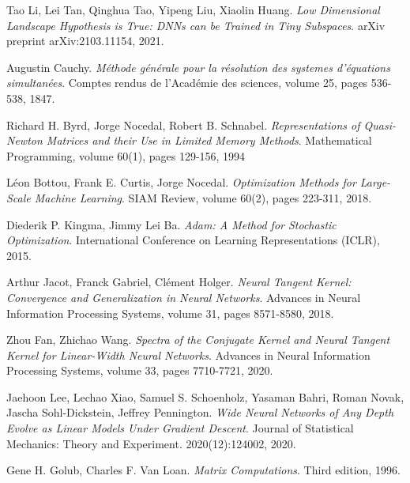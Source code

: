 \documentclass[11pt, a4paper]{article}
\begin{document}
\pagebreak
\begin{thebibliography}{999}

 Tao Li, Lei Tan, Qinghua Tao, Yipeng Liu, Xiaolin Huang. \textit{Low Dimensional Landscape Hypothesis is True: DNNs can be Trained in Tiny Subspaces}. arXiv preprint arXiv:2103.11154, 2021.

 Augustin Cauchy. \textit{M\'{e}thode g\'{e}n\'{e}rale pour la r\'{e}solution des systemes d'\'{e}quations simultan\'{e}es}. Comptes rendus de l'Acad\'{e}mie des sciences, volume 25, pages 536-538, 1847.

 Richard H. Byrd, Jorge Nocedal, Robert B. Schnabel. \textit{Representations of Quasi-Newton Matrices and their Use in Limited Memory Methods}. Mathematical Programming, volume 60(1), pages 129-156, 1994 

 L\'{e}on Bottou, Frank E. Curtis, Jorge Nocedal. \textit{Optimization Methods for Large-Scale Machine Learning}. SIAM Review, volume 60(2), pages 223-311, 2018.

 Diederik P. Kingma, Jimmy Lei Ba. \textit{Adam: A Method for Stochastic Optimization}. International Conference on Learning Representations (ICLR), 2015.

 Arthur Jacot, Franck Gabriel, Cl\'{e}ment Holger. \textit{Neural Tangent Kernel: Convergence and Generalization in Neural Networks}. Advances in Neural Information Processing Systems, volume 31, pages 8571-8580, 2018.

 Zhou Fan, Zhichao Wang. \textit{Spectra of the Conjugate Kernel and Neural Tangent Kernel for Linear-Width Neural Networks}. Advances in Neural Information Processing Systems, volume 33, pages 7710-7721, 2020.

 Jaehoon Lee, Lechao Xiao, Samuel S. Schoenholz, Yasaman Bahri, Roman Novak, Jascha Sohl-Dickstein, Jeffrey Pennington. \textit{Wide Neural Networks of Any Depth Evolve as Linear Models Under Gradient Descent}. Journal of Statistical Mechanics: Theory and Experiment. 2020(12):124002, 2020.

 Gene H. Golub, Charles F. Van Loan. \textit{Matrix Computations}. Third edition, 1996.

\end{thebibliography}
\end{document}
